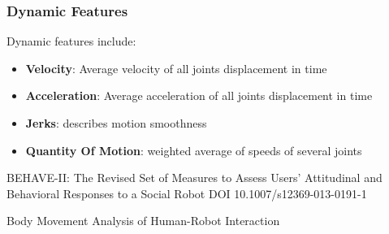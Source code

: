 \subsubsection{Dynamic Features}
Dynamic features include:
\begin{itemize}[noitemsep,nolistsep]
\item \textbf{Velocity}: Average velocity of all joints displacement in time
\item \textbf{Acceleration}: Average acceleration of all joints displacement in time
\item \textbf{Jerks}: describes motion smoothness
\item \textbf{Quantity Of Motion}: weighted average of speeds of several joints
\end{itemize}





BEHAVE-II: The Revised Set of Measures to Assess Users’
Attitudinal and Behavioral Responses to a Social Robot
DOI 10.1007/s12369-013-0191-1

Body Movement Analysis of Human-Robot Interaction




